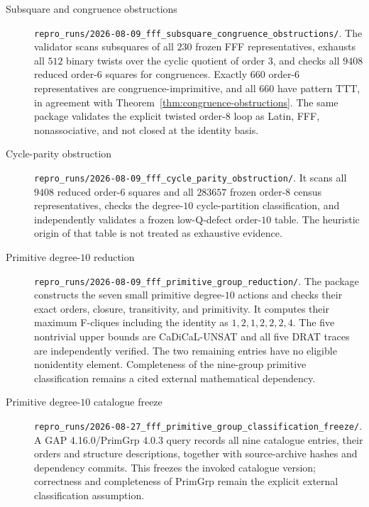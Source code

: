 \begin{description}
\item[Subsquare and congruence obstructions]
\nolinkurl{repro_runs/2026-08-09_fff_subsquare_congruence_obstructions/}.
The validator scans subsquares of all $230$ frozen FFF representatives,
exhausts all $512$ binary twists over the cyclic quotient of order $3$, and
checks all $9408$ reduced order-$6$ squares for congruences.  Exactly $660$
order-$6$ representatives are congruence-imprimitive, and all $660$ have
pattern TTT, in agreement with Theorem~\ref{thm:congruence-obstructions}.
The same package validates the explicit twisted order-$8$ loop as Latin,
FFF, nonassociative, and not closed at the identity basis.

\item[Cycle-parity obstruction]
\nolinkurl{repro_runs/2026-08-09_fff_cycle_parity_obstruction/}.
It scans all $9408$ reduced order-$6$ squares and all $283657$ frozen
order-$8$ census representatives, checks the degree-$10$ cycle-partition
classification, and independently validates a frozen low-Q-defect order-$10$
table.  The heuristic origin of that table is not treated as exhaustive
evidence.

\item[Primitive degree-$10$ reduction]
\nolinkurl{repro_runs/2026-08-09_fff_primitive_group_reduction/}.
The package constructs the seven small primitive degree-$10$ actions and
checks their exact orders, closure, transitivity, and primitivity.  It
computes their maximum F-cliques including the identity as
$1,2,1,2,2,2,4$.  The five nontrivial upper bounds are CaDiCaL-UNSAT and all
five DRAT traces are independently verified.  The two remaining entries have
no eligible nonidentity element.  Completeness of the nine-group primitive
classification remains a cited external mathematical dependency.

\item[Primitive degree-$10$ catalogue freeze]
\nolinkurl{repro_runs/2026-08-27_fff_primitive_group_classification_freeze/}.
A GAP 4.16.0/PrimGrp 4.0.3 query records all nine catalogue entries, their
orders and structure descriptions, together with source-archive hashes and
dependency commits.  This freezes the invoked catalogue version; correctness
and completeness of PrimGrp remain the explicit external classification
assumption.


\end{description}
